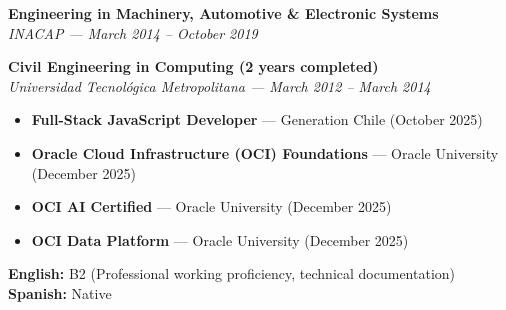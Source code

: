 \documentclass[10pt,letterpaper]{article}
\begin{document}
\vspace{0.3cm}

\vspace{0.4cm}

\vspace{0.3cm}

\noindent \textbf{Engineering in Machinery, Automotive \& Electronic Systems} \\
\textit{INACAP — March 2014 – October 2019}

\vspace{0.2cm}

\noindent \textbf{Civil Engineering in Computing (2 years completed)} \\
\textit{Universidad Tecnológica Metropolitana — March 2012 – March 2014}

\vspace{0.4cm}


\vspace{0.3cm}

\begin{itemize}
    \item \textbf{Full-Stack JavaScript Developer} — Generation Chile (October 2025)
    \item \textbf{Oracle Cloud Infrastructure (OCI) Foundations} — Oracle University (December 2025)
    \item \textbf{OCI AI Certified} — Oracle University (December 2025)
    \item \textbf{OCI Data Platform} — Oracle University (December 2025)
\end{itemize}

\vspace{0.4cm}


\vspace{0.3cm}

\noindent \textbf{English:} B2 (Professional working proficiency, technical documentation) \\
\noindent \textbf{Spanish:} Native

\vspace{0.4cm}


\vspace{0.3cm}
\end{document}
